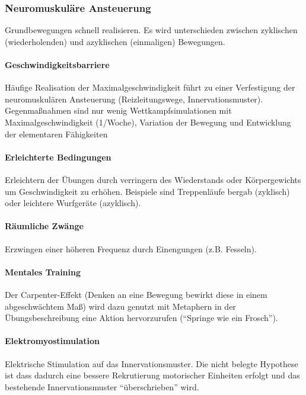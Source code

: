 \subsubsection{Neuromuskuläre Ansteuerung}
Grundbewegungen schnell realisieren. Es wird unterschieden zwischen zyklischen (wiederholenden) und azyklischen (einmaligen) Bewegungen.
\paragraph{Geschwindigkeitsbarriere} Häufige Realisation der Maximalgeschwindigkeit führt zu einer Verfestigung der neuromuskulären Ansteuerung (Reizleitungswege, Innervationsmuster).
Gegenmaßnahmen sind nur wenig Wettkampfsimulationen mit Maximalgeschwindigkeit (1/Woche), Variation der Bewegung und Entwicklung der elementaren Fähigkeiten
\paragraph{Erleichterte Bedingungen} Erleichtern der Übungen durch verringern des Wiederstands oder Körpergewichts um Geschwindigkeit zu erhöhen.
Beispiele sind Treppenläufe bergab (zyklisch) oder leichtere Wurfgeräte (azyklisch).
\paragraph{Räumliche Zwänge} Erzwingen einer höheren Frequenz durch Einengungen (z.B. Fesseln).
\paragraph{Mentales Training} Der Carpenter-Effekt (Denken an eine Bewegung bewirkt diese in einem abgeschwächtem Maß) wird dazu genutzt mit Metaphern in der Übungsbeschreibung eine Aktion hervorzurufen (``Springe wie ein Frosch'').
\paragraph{Elektromyostimulation} Elektrische Stimulation auf das Innervationsmuster. Die nicht belegte Hypothese ist dass dadurch eine bessere Rekrutierung motorischer Einheiten erfolgt und das bestehende Innervationsmuster ``überschrieben'' wird.

